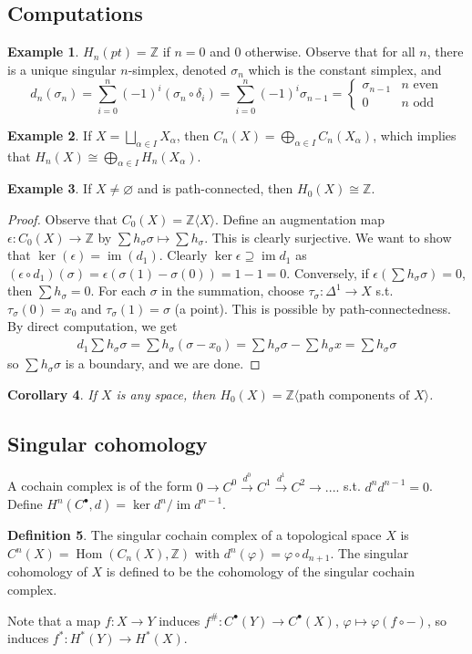 \documentclass{article}
\theoremstyle{definition}
\newtheorem{defn}{Definition}[section]
\newtheorem{example}[defn]{Example}
\theoremstyle{remark}
\theoremstyle{plain}
\newtheorem{crly}[defn]{Corollary}
\newcommand{\ZZ}{\mathbb{Z}}
\begin{document}
\subsection{Computations}
\begin{example}
    $H_n(pt)=\ZZ$ if $n=0$ and $0$ otherwise. Observe that for all $n$, there is a unique singular $n$-simplex, denoted $\sigma_n$ which is the constant simplex, and 
    \[d_n(\sigma_n)=\sum_{i=0}^n(-1)^i(\sigma_n\circ\delta_i)=\sum_{i=0}^n(-1)^i\sigma_{n-1}=\begin{cases}
        \sigma_{n-1}& n\text{ even}\\
        0 & n\text{ odd}
    \end{cases}\]
\end{example}
\begin{example}
    If $X=\bigsqcup_{\alpha\in I}X_\alpha$, then $C_n(X)=\bigoplus_{\alpha\in I}C_n(X_\alpha)$, which implies that $H_n(X)\cong\bigoplus_{\alpha\in I}H_n(X_\alpha)$.
\end{example}
\begin{example}
    If $X\neq\varnothing$ and is path-connected, then $H_0(X)\cong \ZZ$.
    \begin{proof}
        Observe that $C_0(X)=\ZZ\langle X\rangle$. Define an augmentation map $\epsilon:C_0(X)\to\ZZ$ by $\sum h_\sigma\sigma\mapsto\sum h_\sigma$. This is clearly surjective. We want to show that $\ker(\epsilon)=\operatorname{im}(d_1)$. Clearly $\ker\epsilon\supseteq\operatorname{im}d_1$ as $(\epsilon\circ d_1)(\sigma)=\epsilon(\sigma(1)-\sigma(0))=1-1=0$. Conversely, if $\epsilon(\sum h_\sigma\sigma)=0$, then $\sum h_\sigma=0$. For each $\sigma$ in the summation, choose $\tau_\sigma:\Delta^1\to X$ s.t. $\tau_\sigma(0)=x_0$ and $\tau_\sigma(1)=\sigma$ (a point). This is possible by path-connectedness. By direct computation, we get
        \begin{align*}
            d_1\sum h_\sigma\sigma=\sum h_\sigma(\sigma-x_0)=\sum h_\sigma\sigma-\sum h_\sigma x=\sum h_\sigma\sigma
        \end{align*}
        so $\sum h_\sigma\sigma$ is a boundary, and we are done.
    \end{proof}
\end{example}
\begin{crly}
    If $X$ is any space, then $H_0(X)=\ZZ\langle\text{path components of }X\rangle$.
\end{crly}
\subsection{Singular cohomology}
A cochain complex is of the form $0\to C^0\overset{d^0}{\to} C^1\overset{d^1}{\to}C^2\to....$ s.t. $d^nd^{n-1}=0$. Define $H^n(C^\bullet,d)=\ker d^n/\operatorname{im}d^{n-1}$. 
\begin{defn}
    The singular cochain complex of a topological space $X$ is $C^n(X)=\operatorname{Hom}(C_n(X),\ZZ)$ with $d^n(\varphi)=\varphi\circ d_{n+1}$. The singular cohomology of $X$ is defined to be the cohomology of the singular cochain complex.
\end{defn}
Note that a map $f:X\to Y$ induces $f^\#:C^\bullet(Y)\to C^\bullet(X)$, $\varphi\mapsto\varphi(f\circ - )$, so induces $f^\ast: H^\ast(Y)\to H^\ast(X)$.
\end{document}
